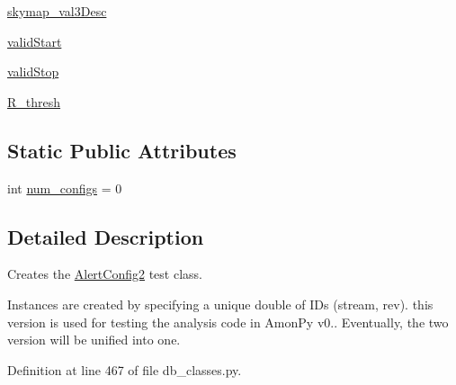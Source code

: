 \begin{DoxyCompactItemize}
\item 
\hyperlink{classamonpy_1_1dbase_1_1db__classes_1_1_alert_config2_a6c28894bd6690a2b0faeb36be8eb351f}{skymap\-\_\-val3\-Desc}
\item 
\hyperlink{classamonpy_1_1dbase_1_1db__classes_1_1_alert_config2_ac8bd043fc32dc2de20f5ee1cf57762e7}{valid\-Start}
\item 
\hyperlink{classamonpy_1_1dbase_1_1db__classes_1_1_alert_config2_a0338a9f4188da7e5b4e977a6d6a32dff}{valid\-Stop}
\item 
\hyperlink{classamonpy_1_1dbase_1_1db__classes_1_1_alert_config2_a94dabae815e574e6453b65d4efd9c0b0}{R\-\_\-thresh}
\end{DoxyCompactItemize}
\subsection*{Static Public Attributes}
\begin{DoxyCompactItemize}
\item 
int \hyperlink{classamonpy_1_1dbase_1_1db__classes_1_1_alert_config2_a17be669e8bdfa435ca0fe275a71479dd}{num\-\_\-configs} = 0
\end{DoxyCompactItemize}


\subsection{Detailed Description}
Creates the \hyperlink{classamonpy_1_1dbase_1_1db__classes_1_1_alert_config2}{Alert\-Config2} test class. 

Instances are created by specifying a unique double of I\-Ds (stream, rev). this version is used for testing the analysis code in Amon\-Py v0.. Eventually, the two version will be unified into one. 

Definition at line 467 of file db\-\_\-classes.\-py.



